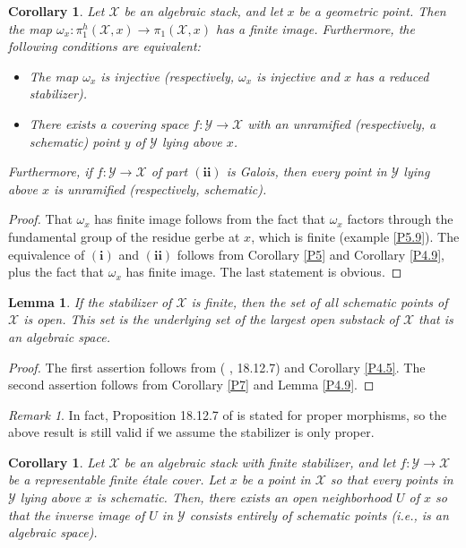 \documentclass{amsart}
\newtheorem{cor}[thm]{Corollary}
\newtheorem{lem}[thm]{Lemma}
\theoremstyle{definition}
\theoremstyle{remark}
\newtheorem{rem}[thm]{Remark}
\theoremstyle{remark}
\newcommand{\X}{\mathcal{X}}
\newcommand{\Y}{\mathcal{Y}}
\newcommand{\ox}{\omega_x}
\newcommand{\pX}{\pi_1(\X,x)}
\newcommand{\phX}{\pi_1^{h}(\X,x)}
\let\:=\colon
\begin{document}
\begin{cor}{\label{P7}}
Let $\X$ be an algebraic stack, and let $x$ be a geometric point.
Then the map $\ox \: \phX \to \pX$ has a finite image.
Furthermore, the following conditions are equivalent:

\begin{itemize}
\item[$\mathbf{i})$] The map $\omega_x$ is injective
(respectively, $\omega_x$ is injective and $x$ has a reduced
stabilizer).

\item[$\mathbf{ii})$] There exists a covering  space
$f \: \Y \to \X$ with an unramified (respectively, a schematic)
point $y$ of $\Y$ lying above $x$.
\end{itemize}

\noindent  Furthermore, if $f \: \Y \to \X$ of part
$(\mathbf{ii})$ is Galois, then every point in $\Y$ lying above
$x$ is unramified (respectively, schematic).
\end{cor}

\begin{proof}
That $\ox$ has finite image follows from the fact that $\ox$
factors through the fundamental group of the residue gerbe at $x$,
which is finite (example \ref{P5.9}). The equivalence of
$(\mathbf{i})$ and $(\mathbf{ii})$ follows from Corollary \ref{P5}
and Corollary \ref{P4.9}, plus the fact that $\ox$ has finite
image.  The last statement is obvious.
\end{proof}

\begin{lem}{\label{P7.5}}
If the stabilizer of $\X$ is finite, then the set of all schematic
points of $\X$ is open. This set is the underlying set of the
largest open substack of $\X$ that is an algebraic space.
\end{lem}

\begin{proof}
The first assertion follows from (\cite{EGA4} , 18.12.7) and
Corollary \ref{P4.5}. The second assertion follows from Corollary
\ref{P7} and Lemma \ref{P4.9}.
\end{proof}

\begin{rem}
In fact,  Proposition 18.12.7 of \cite{EGA4} is stated for proper
morphisms, so the above result is still valid if we assume the
stabilizer is only proper.
\end{rem}

\begin{cor}{\label{P7.6}}
Let $\X$ be an algebraic stack with finite stabilizer, and let $f
\: \Y \to \X$ be a representable finite \'{e}tale cover. Let $x$
be a  point in $\X$ so that every points in $\Y$ lying above $x$
is schematic. Then, there exists an open neighborhood $U$ of $x$
so that the inverse image of $U$ in $\Y$ consists entirely of
schematic points (i.e., is an algebraic space).
\end{cor}
\end{document}
